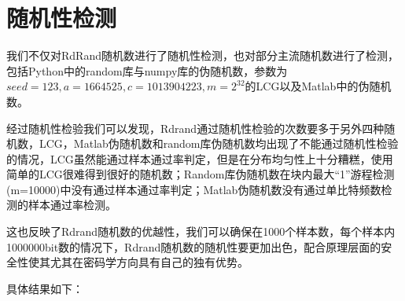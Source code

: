 \documentclass[12pt,a4paper]{article}%
\begin{document}
    \section{随机性检测}
    我们不仅对RdRand随机数进行了随机性检测，也对部分主流随机数进行了检测，包括Python中的random库与numpy库的伪随机数，参数为$seed=123, a=1664525, c=1013904223, m=2^32$的LCG以及Matlab中的伪随机数。

    经过随机性检验我们可以发现，Rdrand通过随机性检验的次数要多于另外四种随机数，LCG，Matlab伪随机数和random库伪随机数均出现了不能通过随机性检验的情况，LCG虽然能通过样本通过率判定，但是在分布均匀性上十分糟糕，使用简单的LCG很难得到很好的随机数；Random库伪随机数在块内最大“1”游程检测(m=10000)中没有通过样本通过率判定；Matlab伪随机数没有通过单比特频数检测的样本通过率检测。

    这也反映了Rdrand随机数的优越性，我们可以确保在1000个样本数，每个样本内1000000bit数的情况下，Rdrand随机数的随机性要更加出色，配合原理层面的安全性使其尤其在密码学方向具有自己的独有优势。

    具体结果如下：
\end{document}
